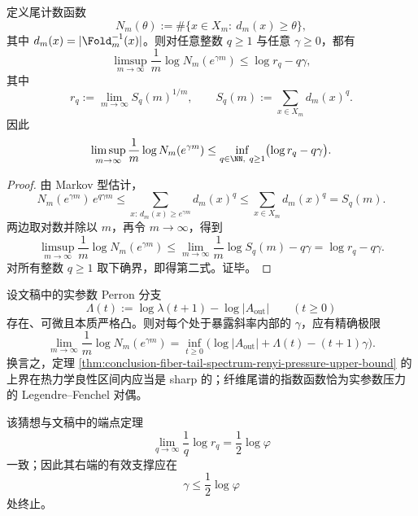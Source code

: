 \begin{theorem}\label{thm:conclusion-fiber-tail-spectrum-renyi-pressure-upper-bound}
定义尾计数函数
\[
N_m(\theta):=\#\{x\in X_m:\ d_m(x)\ge \theta\},
\]
其中 \(d_m(x)=|\Fold_m^{-1}(x)|\)。则对任意整数 \(q\ge 1\) 与任意 \(\gamma\ge 0\)，都有
\[
\limsup_{m\to\infty}\frac1m\log N_m(e^{\gamma m})
\le
\log r_q-q\gamma,
\]
其中
\[
r_q:=\lim_{m\to\infty}S_q(m)^{1/m},
\qquad
S_q(m):=\sum_{x\in X_m}d_m(x)^q.
\]
因此
\[
\limsup_{m\to\infty}\frac1m\log N_m(e^{\gamma m})
\le
\inf_{q\in \NN,\ q\ge 1}\bigl(\log r_q-q\gamma\bigr).
\]
\end{theorem}
\begin{proof}
由 Markov 型估计，
\[
N_m(e^{\gamma m})\,e^{q\gamma m}
\le
\sum_{x:\,d_m(x)\ge e^{\gamma m}}d_m(x)^q
\le
\sum_{x\in X_m}d_m(x)^q
=
S_q(m).
\]
两边取对数并除以 \(m\)，再令 \(m\to\infty\)，得到
\[
\limsup_{m\to\infty}\frac1m\log N_m(e^{\gamma m})
\le
\lim_{m\to\infty}\frac1m\log S_q(m)-q\gamma
=
\log r_q-q\gamma.
\]
对所有整数 \(q\ge 1\) 取下确界，即得第二式。证毕。
\end{proof}

\begin{conjecture}[纤维尾谱的大偏差精确公式]\label{conj:conclusion-fiber-tail-spectrum-legendre-sharp}
设文稿中的实参数 Perron 分支
\[
\Lambda(t):=\log \lambda(t+1)-\log |A_{\mathrm{out}}|
\qquad (t\ge 0)
\]
存在、可微且本质严格凸。则对每个处于暴露斜率内部的 \(\gamma\)，应有精确极限
\[
\lim_{m\to\infty}\frac1m\log N_m(e^{\gamma m})
=
\inf_{t\ge 0}\bigl(\log|A_{\mathrm{out}}|+\Lambda(t)-(t+1)\gamma\bigr).
\]
换言之，定理 \ref{thm:conclusion-fiber-tail-spectrum-renyi-pressure-upper-bound} 的上界在热力学良性区间内应当是 sharp 的；纤维尾谱的指数函数恰为实参数压力的 Legendre--Fenchel 对偶。

该猜想与文稿中的端点定理
\[
\lim_{q\to\infty}\frac{1}{q}\log r_q=\frac12\log\varphi
\]
一致；因此其右端的有效支撑应在
\[
\gamma\le \frac12\log\varphi
\]
处终止。
\end{conjecture}
